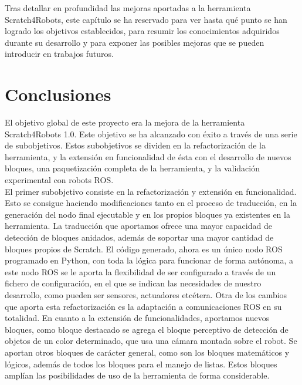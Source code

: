 Tras detallar en profundidad las mejoras aportadas a la herramienta Scratch4Robots,  este capítulo se ha reservado para ver hasta qué punto se han logrado los objetivos establecidos, para resumir los conocimientos adquiridos durante su desarrollo y para exponer las posibles mejoras que se pueden introducir en trabajos futuros.

\section{Conclusiones}
\label{sec:conclusiones}

El objetivo global de este proyecto era la mejora de la herramienta Scratch4Robots 1.0. Este objetivo se ha alcanzado con éxito a través de una serie de subobjetivos. Estos subobjetivos se dividen en la refactorización de la herramienta, y la extensión en funcionalidad de ésta con el desarrollo de nuevos bloques, una paquetización completa de la herramienta, y la validación experimental con robots ROS.\\

El primer subobjetivo consiste en la refactorización y extensión en funcionalidad. Esto se consigue haciendo modificaciones tanto en el proceso de traducción, en la generación del nodo final ejecutable y en los propios bloques ya existentes en la herramienta. La traducción que aportamos ofrece una mayor capacidad de detección de bloques anidados, además de soportar una mayor cantidad de bloques propios de Scratch. El código generado, ahora es un único nodo ROS programado en Python, con toda la lógica para funcionar de forma autónoma, a este nodo ROS se le aporta la flexibilidad de ser configurado a través de un fichero de configuración, en el que se indican las necesidades de nuestro desarrollo, como pueden ser sensores, actuadores etcétera. Otra de los cambios que aporta esta refactorización es la adaptación a comunicaciones ROS en su totalidad. En cuanto a la extensión de funcionalidades, aportamos nuevos bloques, como bloque destacado se agrega el bloque perceptivo de detección de objetos de un color determinado, que usa una cámara montada sobre el robot. Se aportan otros bloques de carácter general, como son los bloques matemáticos y lógicos, además de todos los bloques para el manejo de listas. Estos bloques amplían las posibilidades de uso de la herramienta de forma considerable.\\

